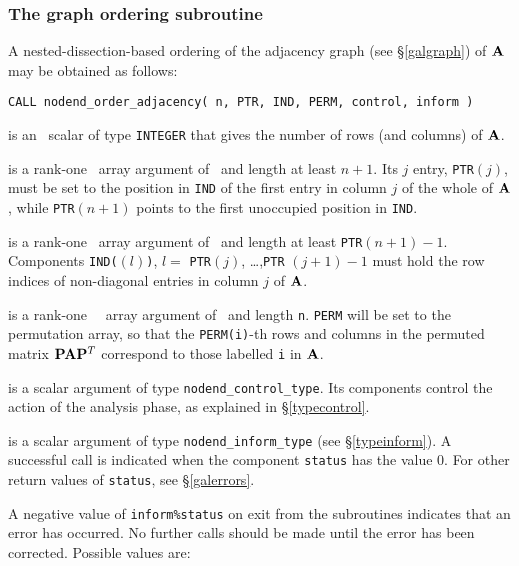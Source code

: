 \documentclass{galahad}
\newcommand{\packagename}{nodend}
\begin{document}
\subsubsection{The graph ordering subroutine}\label{subgraphorder}
A nested-dissection-based ordering of the adjacency graph (see 
\S\ref{galgraph}) of ${\mathbf{A}}$ may be obtained as follows:
\vskip2mm

\hskip0.5in
{\tt CALL \packagename\_order\_adjacency( n, PTR, IND, PERM, control, inform )}
\begin{description}
 is an \intentin\ scalar of type  {\tt INTEGER} that gives the
number of rows (and columns) of ${\mathbf{A}}$.

 is a rank-one \integer\ array argument of \intentin\ and length 
 at least $n+1$. Its $j$ entry, {\tt PTR}$(j)$, must be set to the position
 in {\tt IND} of the first entry in column $j$ of the whole of ${\mathbf{A}}$,
 while {\tt PTR}$(n+1)$ points to the first unoccupied position in {\tt IND}.

 is a rank-one \integer\ array argument of \intentin\ and length 
 at least  {\tt PTR}$(n+1)-1$. Components
 {\tt IND(}$(l)${\tt )}, $l =$ {\tt PTR}$(j)$, \ldots ,{\tt PTR} $(j+1)-1$
 must hold the row indices of non-diagonal entries in column $j$ of ${\mathbf{A}}$.

 is a rank-one \integer\ \intentout\ array argument
 of \intentout\ and length {\tt n}.
 {\tt PERM} will be set to the permutation array, so that the 
 {\tt PERM(i)}-th rows and columns in the permuted matrix 
 ${\mathbf{P}} {\mathbf{A}} {\mathbf{P}}^T$ correspond to those labelled {\tt i} in ${\mathbf{A}}$.

 is a scalar \intentout argument of type
{\tt \packagename\_control\_type}. Its components control the action
of the analysis phase, as explained in
\S\ref{typecontrol}.

 is a scalar \intentout argument of type
{\tt \packagename\_inform\_type}
(see \S\ref{typeinform}).
A successful call is indicated when the  component {\tt status} has the value 0.
For other return values of {\tt status}, see \S\ref{galerrors}.
\end{description}


\galerrors
A negative value of {\tt inform\%status} on exit from the subroutines
indicates that an error has occurred. No further calls should be made
until the error has been corrected. Possible values are:
\end{document}
